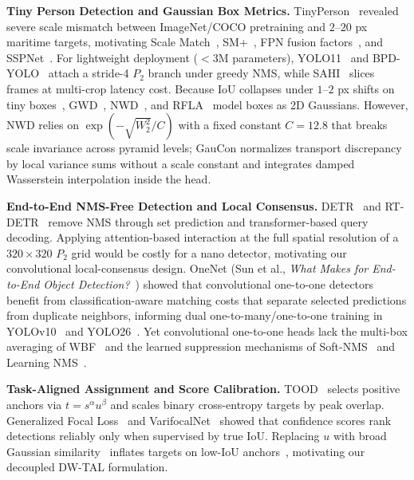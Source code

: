 \documentclass[10pt,twocolumn,letterpaper]{article}
\begin{document}
\textbf{Tiny Person Detection and Gaussian Box Metrics.} TinyPerson~\cite{yu2020tinyperson} revealed severe scale mismatch between ImageNet/COCO pretraining and $2\text{--}20$ px maritime targets, motivating Scale Match~\cite{yu2020tinyperson}, SM+~\cite{jiang2021smplus}, FPN fusion factors~\cite{gong2021fusionfactor}, and SSPNet~\cite{hong2022sspnet}. For lightweight deployment ($<3$M parameters), YOLO11~\cite{ultralytics2024yolo11} and BPD-YOLO~\cite{chao2025bpdyolo} attach a stride-4 $P_2$ branch under greedy NMS, while SAHI~\cite{akyon2022sahi} slices frames at multi-crop latency cost. Because IoU collapses under $1\text{--}2$ px shifts on tiny boxes~\cite{wang2020aitod}, GWD~\cite{yang2021gwd}, NWD~\cite{wang2021nwd,xu2022nwd_isprs}, and RFLA~\cite{chen2021rfla} model boxes as 2D Gaussians. However, NWD relies on $\exp(-\sqrt{W_2^2}/C)$ with a fixed constant $C=12.8$ that breaks scale invariance across pyramid levels; GauCon normalizes transport discrepancy by local variance sums without a scale constant and integrates damped Wasserstein interpolation inside the head.

\textbf{End-to-End NMS-Free Detection and Local Consensus.} DETR~\cite{carion2020detr} and RT-DETR~\cite{zhao2024rtdetr} remove NMS through set prediction and transformer-based query decoding. Applying attention-based interaction at the full spatial resolution of a $320\times 320$ $P_2$ grid would be costly for a nano detector, motivating our convolutional local-consensus design. OneNet (Sun et al., \textit{What Makes for End-to-End Object Detection?}~\cite{sun2021onenet}) showed that convolutional one-to-one detectors benefit from classification-aware matching costs that separate selected predictions from duplicate neighbors, informing dual one-to-many/one-to-one training in YOLOv10~\cite{wang2024yolov10} and YOLO26~\cite{ultralytics2026yolo}. Yet convolutional one-to-one heads lack the multi-box averaging of WBF~\cite{solovyev2021wbf} and the learned suppression mechanisms of Soft-NMS~\cite{bodla2017softnms} and Learning NMS~\cite{hosang2017learning}.

\textbf{Task-Aligned Assignment and Score Calibration.} TOOD~\cite{feng2021tood} selects positive anchors via $t = s^\alpha u^\beta$ and scales binary cross-entropy targets by peak overlap. Generalized Focal Loss~\cite{li2020gfl} and VarifocalNet~\cite{zhang2021varifocalnet} showed that confidence scores rank detections reliably only when supervised by true IoU. Replacing $u$ with broad Gaussian similarity~\cite{wang2021nwd} inflates targets on low-IoU anchors~\cite{bolya2020tide}, motivating our decoupled DW-TAL formulation.
\end{document}
